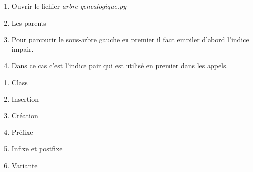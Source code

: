 \documentclass[a4paper,11pt]{article}
\begin{document}
\begin{Form}
\begin{exo}
\begin{enumerate}
            \item Ouvrir le fichier \emph{arbre-genealogique.py}.
            \item Les parents
                  
            \item Pour parcourir le sous-arbre gauche en premier il faut empiler d'abord l'indice impair.
                  
            \item Dans ce cas c'est l'indice pair qui est utilisé en premier dans les appels.
                  
        \end{enumerate}
    \end{exo}
    \begin{exo}
        \begin{enumerate}
            \item Class
                  
            \item Insertion
                  
            \item Création
                  
            \item Préfixe
                  
            \item Infixe et postfixe
                  
                  
            \item Variante
                  
        \end{enumerate}
    \end{exo}
\end{Form}
\end{document}
